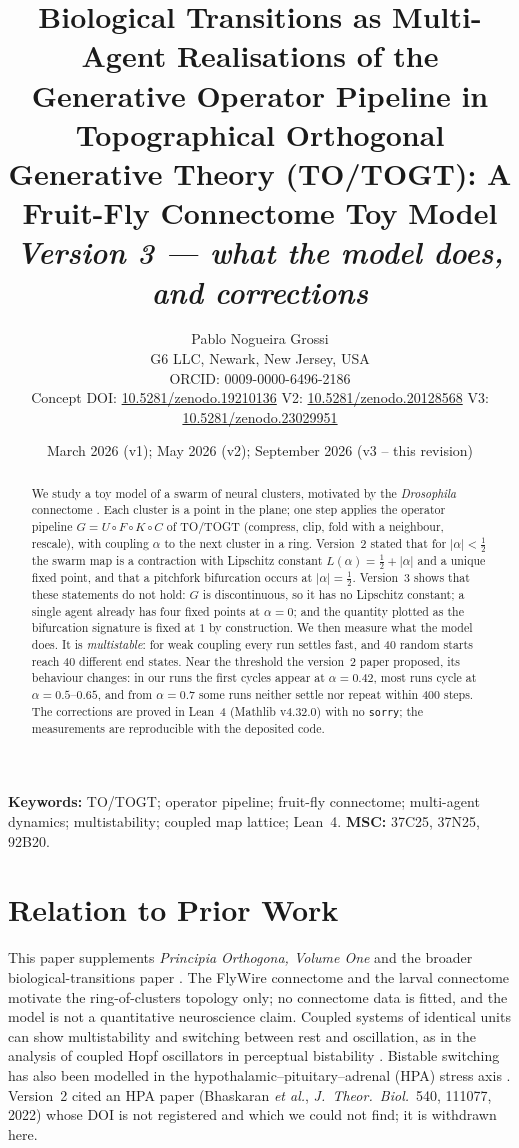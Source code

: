 \documentclass[11pt,a4paper]{article}
\title{\textbf{Biological Transitions as Multi-Agent Realisations of the}\\
\textbf{Generative Operator Pipeline in Topographical Orthogonal}\\
\textbf{Generative Theory (TO/TOGT): A Fruit-Fly Connectome Toy Model}\\[0.5em]
\large\emph{Version 3 --- what the model does, and corrections}}
\author{Pablo Nogueira Grossi\\
G6 LLC, Newark, New Jersey, USA\\
ORCID: 0009-0000-6496-2186\\[0.3em]
\small Concept DOI: \href{https://doi.org/10.5281/zenodo.19210136}{10.5281/zenodo.19210136}
\quad V2: \href{https://doi.org/10.5281/zenodo.20128568}{10.5281/zenodo.20128568}
\quad V3: \href{https://doi.org/10.5281/zenodo.23029951}{10.5281/zenodo.23029951}}
\date{March 2026 (v1); May 2026 (v2); September 2026 (v3 -- this revision)}
\theoremstyle{definition}
\theoremstyle{remark}
\begin{document}
\maketitle

\begin{abstract}
We study a toy model of a swarm of neural clusters, motivated by the \textit{Drosophila} connectome
\cite{Dorkenwald2024}. Each cluster is a point in the plane; one step applies the operator pipeline
$G=U\circ F\circ K\circ C$ of TO/TOGT (compress, clip, fold with a neighbour, rescale), with coupling
$\alpha$ to the next cluster in a ring. Version~2 stated that for $|\alpha|<\tfrac12$ the swarm map is a
contraction with Lipschitz constant $L(\alpha)=\tfrac12+|\alpha|$ and a unique fixed point, and that a
pitchfork bifurcation occurs at $|\alpha|=\tfrac12$. Version~3 shows that these statements do not hold: $G$ is
discontinuous, so it has no Lipschitz constant; a single agent already has four fixed points at $\alpha=0$;
and the quantity plotted as the bifurcation signature is fixed at $1$ by construction. We then measure what
the model does. It is \emph{multistable}: for weak coupling every run settles fast, and 40 random starts reach
40 different end states. Near the threshold the version~2 paper proposed, its behaviour changes: in our runs
the first cycles appear at $\alpha=0.42$, most runs cycle at $\alpha=0.5$--$0.65$, and from $\alpha=0.7$ some
runs neither settle nor repeat within 400 steps. The corrections are proved in Lean~4 (Mathlib v4.32.0) with no
\texttt{sorry}; the measurements are reproducible with the deposited code.
\end{abstract}

\noindent\textbf{Keywords:} TO/TOGT; operator pipeline; fruit-fly connectome; multi-agent dynamics;
multistability; coupled map lattice; Lean~4.\quad
\textbf{MSC:} 37C25, 37N25, 92B20.

\section{Relation to Prior Work}
This paper supplements \textit{Principia Orthogona, Volume One} \cite{Grossi2026_Vol1} and the broader
biological-transitions paper \cite{Grossi2026_MultiAgent}. The FlyWire connectome \cite{Dorkenwald2024,
Schlegel2024} and the larval connectome \cite{Winding2023} motivate the ring-of-clusters topology only; no
connectome data is fitted, and the model is not a quantitative neuroscience claim. Coupled systems of
identical units can show multistability and switching between rest and oscillation, as in the analysis of
coupled Hopf oscillators in perceptual bistability \cite{PerezCervera2019}. Bistable switching has also been
modelled in the hypothalamic--pituitary--adrenal (HPA) stress axis \cite{Zarzer2013}. Version~2 cited an HPA
paper (Bhaskaran \textit{et al.}, \textit{J.\ Theor.\ Biol.}\ 540, 111077, 2022) whose DOI is not registered
and which we could not find; it is withdrawn here.
\end{document}
